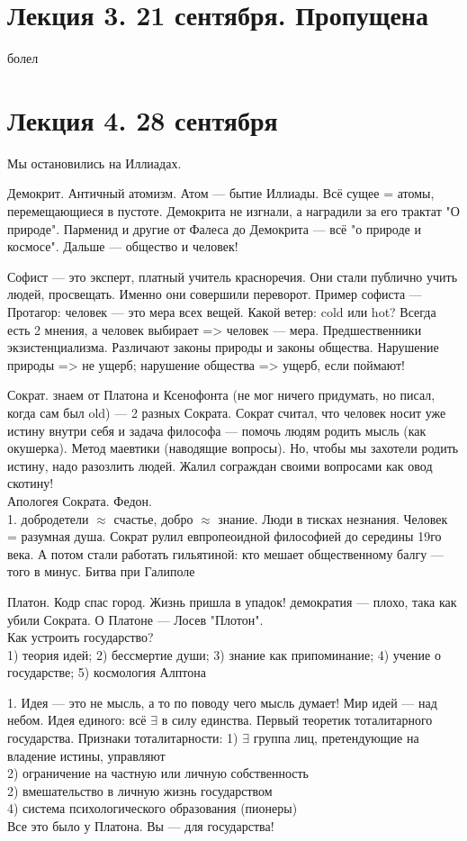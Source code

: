 \documentclass[a4paper,12pt]{article}
\begin{document}
\section{Лекция 3. 21 сентября. Пропущена} болел
\section{Лекция 4. 28 сентября}
Мы остановились на Иллиадах.

Демокрит. Античный атомизм. Атом --- бытие Иллиады. Всё сущее = атомы, перемещающиеся в пустоте. Демокрита не изгнали, а наградили за его трактат "О природе". Парменид и другие от Фалеса до Демокрита --- всё "о природе и космосе". Дальше --- общество и человек!

Софист --- это эксперт, платный учитель красноречия. Они стали публично учить людей, просвещать. Именно они совершили переворот. Пример софиста --- Протагор: человек --- это мера всех вещей. Какой ветер: cold или hot? Всегда есть 2 мнения, а человек выбирает => человек --- мера. Предшественники экзистенциализма. Различают законы природы и законы общества. Нарушение природы => не ущерб; нарушение общества => ущерб, если поймают!

Сократ. знаем от Платона и Ксенофонта (не мог ничего придумать, но писал, когда сам был old) --- 2 разных Сократа. Сократ считал, что человек носит уже истину внутри себя и задача философа --- помочь людям родить мысль (как окушерка). Метод маевтики (наводящие вопросы). Но, чтобы мы захотели родить истину, надо разозлить людей. Жалил сограждан своими вопросами как овод скотину!\\
Апологея Сократа. Федон.\\
1. добродетели $\approx$ счастье, добро $\approx$ знание. Люди в тисках незнания. Человек = разумная душа. Сократ рулил евпропеоидной философией до середины 19го века. А потом стали работать гильятиной: кто мешает общественному балгу --- того в минус. Битва при Галиполе

Платон. Кодр спас город. Жизнь пришла в упадок! демократия --- плохо, така как убили Сократа. О Платоне --- Лосев "Плотон". \\
Как устроить государство?\\
1) теория идей; 2) бессмертие души; 3) знание как припоминание; 4) учение о государстве; 5) космология Алптона

1. Идея --- это не мысль, а то по поводу чего мысль думает! Мир идей --- над небом. Идея единого: всё $\exists$ в силу единства. Первый теоретик тоталитарного государства. Признаки тоталитарности:
1) $\exists$ группа лиц, претендующие на владение истины, управляют\\
2) ограничение на частную или личную собственность\\
2) вмешательство в личную жизнь государством\\
4) система психологического образования (пионеры)\\
Все это было у Платона. Вы --- для государства!
\end{document}
